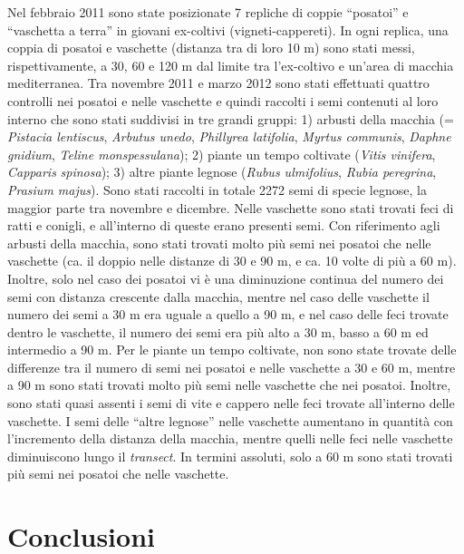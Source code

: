Nel febbraio 2011 sono state posizionate 7 repliche di coppie
{\textquotedblleft}posatoi{\textquotedblright} e
{\textquotedblleft}vaschetta a terra{\textquotedblright} in giovani
ex-coltivi (vigneti-cappereti). In ogni replica, una coppia di posatoi
e vaschette (distanza tra di loro 10 m) sono stati messi,
rispettivamente, a 30, 60 e 120 m dal limite tra
l{\textquoteright}ex-coltivo e un{\textquoteright}area di macchia
mediterranea. Tra novembre 2011 e marzo 2012 sono stati effettuati
quattro controlli nei posatoi e nelle vaschette e quindi raccolti i
semi contenuti al loro interno che sono stati suddivisi in tre grandi
gruppi: 1) arbusti della macchia (= \textit{Pistacia lentiscus},
\textit{Arbutus unedo}, \textit{Phillyrea latifolia}, \textit{Myrtus
communis}, \textit{Daphne gnidium}, \textit{Teline monspessulana}); 2)
piante un tempo coltivate (\textit{Vitis vinifera}, \textit{Capparis}
\textit{spinosa}); 3) altre piante legnose (\textit{Rubus ulmifolius},
\textit{Rubia peregrina}, \textit{Prasium majus}). Sono stati raccolti
in totale 2272 semi di specie legnose, la maggior parte tra novembre e
dicembre. Nelle vaschette sono stati trovati feci di ratti e conigli, e
all{\textquoteright}interno di queste erano presenti semi. Con
riferimento agli arbusti della macchia, sono stati trovati molto pi\`u
semi nei posatoi che nelle vaschette (ca. il doppio nelle distanze di
30 e 90 m, e ca. 10 volte di pi\`u a 60 m). Inoltre, solo nel caso dei
posatoi vi \`e una diminuzione continua del numero dei semi con
distanza crescente dalla macchia, mentre nel caso delle vaschette il
numero dei semi a 30 m era uguale a quello a 90 m, e nel caso delle
feci trovate dentro le vaschette, il numero dei semi era pi\`u alto a
30 m, basso a 60 m ed intermedio a 90 m. Per le piante un tempo
coltivate, non sono state trovate delle differenze tra il numero di
semi nei posatoi e nelle vaschette a 30 e 60 m, mentre a 90 m sono
stati trovati molto pi\`u semi nelle vaschette che nei posatoi.
Inoltre, sono stati quasi assenti i semi di vite e cappero nelle feci
trovate all{\textquoteright}interno delle vaschette. I semi delle
{\textquotedblleft}altre legnose{\textquotedblright} nelle vaschette
aumentano in quantit\`a con l{\textquoteright}incremento della distanza
della macchia, mentre quelli nelle feci nelle vaschette diminuiscono
lungo il \textit{transect}. In termini assoluti, solo a 60 m sono stati
trovati pi\`u semi nei posatoi che nelle vaschette. 

\section*{Conclusioni}


